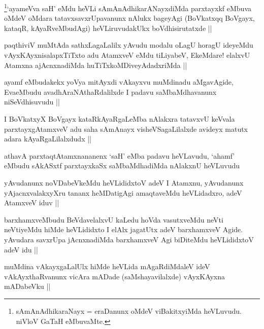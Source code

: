\begin{artha}
\footnote[2]{sAmAnAdhikaraNayx = eraDanunx oMdeV viBakitxyiMda
  heVLuvudu. niVloV GaTaH eMbuvaMte.}`ayameVva saH' eMdu heVLi sAmAnAdhikarANayxdiMda
parxtayxkf eMbuva oMdeV oMdara tatavxsavxrUpavanunx nAlukx bageyAgi
(BoVkatxqq BoVgayx, kataqR, kAyaRveMbudAgi) heVLiruvudakUkx
boVdhisirutatxde ||
\end{artha}


\begin{artha}
paqthiviV muMtAda sathxLagaLalilx yAvudu modalu oLagU horagU ideyeMdu
vAyxKAyxnisalapxTiTxto adu AtamxveV eMdu tiLiyabeV, EkeMdare! elalxvU
Atamxna ajAcnxnadiMda huTiTxkoMDiveyAdadxriMda || 
\end{artha}

\begin{artha}
ayamf eMbudakekx yoV\s ya mitAyxdi vAkayxvu muMdinadu
aMgavAgide, EvaeMbudu avadhAraNAthaRdalilxde I padavu saMbaMdhavanunx
niSeVdhisuvudu ||
\end{artha}

\begin{artha}
I BoVkatxyX BoVgayx kataRkAyaRgaLeMba nAlakxra tatavxvU keVvala
parxtayxgAtamxveV adu saha sAmAnayx visheVSagaLilalxde avideyx matutx
adara kAyaRgaLilalxdudx ||
\end{artha}

\begin{artha}
athavA parxtaqtAtamxnananenx `saH' eMba padavu heVLavudu, `ahamf'
eMbudu sAkASxtf parxtayxkaSx saMbaMdhadiMda nAlakxnU heVLuvudu
\end{artha}

\begin{artha}
yAvudanunx noVDabeVkeMdu heVLididxtoV adeV I Atamxnu, yAvudanunx
yAjacnxvalakxyXru tananx heMDatigAgi amaqtaveMdu heVLidadxro, adeV
AtamxveV iduv ||
\end{artha}


\begin{artha}
barxhamxveMbudu BeVdavelalxvU kaLedu hoVda vasutxveMdu neVti
neVtiyeMdu hiMde heVLididxto I elAlx jagatUtx adeV barxhamxveV
Agide. yAvudara savxrUpa jAcnxnadiMda barxhamxveV Agi biDiteMdu
heVLididxtoV adeV idu ||
\end{artha}

\begin{artha}
muMdina vAkayxgaLalUlx hiMde heVLida mAgaRdiMdaleV ideV
vAkAyxthaRvanunx vicAra mADade (saMshayavilalxde) vAyxKAyxna mADabeVku ||
\end{artha}

